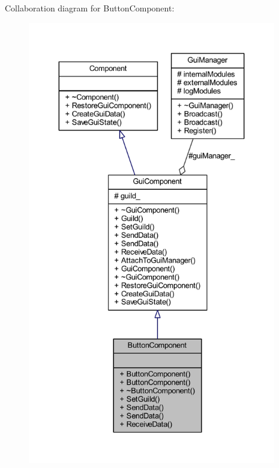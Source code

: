 Collaboration diagram for Button\+Component\+:
\nopagebreak
\begin{figure}[H]
\begin{center}
\leavevmode
\includegraphics[height=550pt]{class_button_component__coll__graph}
\end{center}
\end{figure}
